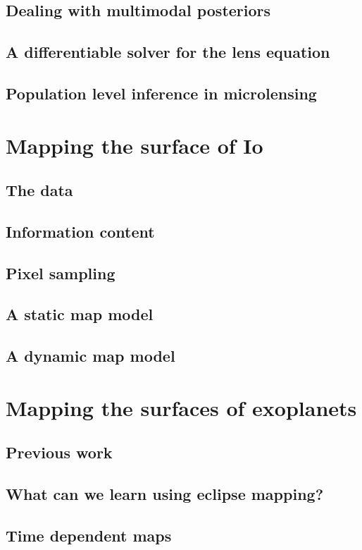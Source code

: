 \documentclass[]{report}
\begin{document}
\section{Dealing with multimodal posteriors}
\section{A differentiable solver for the lens equation}
\section{Population level inference in microlensing}

\chapter{Mapping the surface of Io}
\section{The data}
\section{Information content}
\section{Pixel sampling}
\section{A static map model}
\section{A dynamic map model}

\chapter{Mapping the surfaces of exoplanets}
\section{Previous work}
\section{What can we learn using eclipse mapping?}
\section{Time dependent maps}
\end{document}
